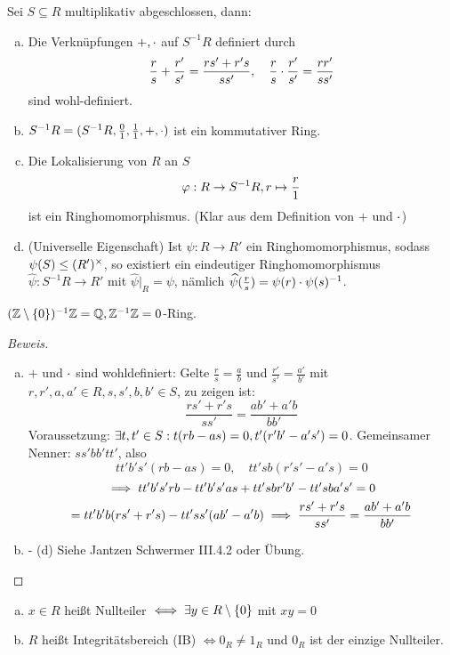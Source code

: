 \documentclass[a4paper]{report}
\begin{document}
\begin{satz}
  Sei $S \subseteq R$ multiplikativ abgeschlossen, dann:
  \begin{enumerate}[(a)]
    \item Die Verknüpfungen $+, \cdot$ auf $S^{-1}R$ definiert durch
          \[\frac rs + \frac {r'}{s'} = \frac{rs'+r's}{ss'}, \quad \frac rs \cdot \frac {r'}{s'} = \frac{rr'}{ss'}\]
          sind wohl-definiert.
    \item $S^{-1}R = (S^{-1}R, \frac 01, \frac 11, +, \cdot)$ ist ein kommutativer Ring.
    \item Die Lokalisierung von $R$ an $S$
          \[\varphi : R \to S^{-1}R, r \mapsto \frac r1\]
          ist ein Ringhomomorphismus. (Klar aus dem Definition von $+$ und $\cdot$)
    \item (Universelle Eigenschaft) Ist $\psi : R \to R'$ ein Ringhomomorphismus, sodass $\psi(S) \le (R')^\times$, so existiert ein eindeutiger Ringhomomorphismus $\hat \psi : S^{-1}R \to R'$ mit $\hat \psi |_{R} = \psi$, nämlich $\widehat \psi (\frac rs) = \psi(r) \cdot \psi(s)^{-1}$.
  \end{enumerate}
\end{satz}
\begin{bsp*}$(\mathbb{Z} \setminus \{0\})^{-1}\mathbb{Z} = \mathbb{Q}, \mathbb{Z}^{-1}\mathbb{Z} = 0$-Ring.
\end{bsp*}
\begin{proof}[Beweis]\item
\begin{enumerate}[(a)]
  \item $+$ und $\cdot$ sind wohldefiniert:
        Gelte $\frac rs = \frac ab$ und $\frac {r'}{s'} = \frac {a'}{b'}$ mit $r, r', a, a' \in R, s, s', b, b' \in S$, zu zeigen ist: \[\frac{rs' + r's}{ss'} = \frac{ab' + a'b}{bb'}\]
        Voraussetzung: $\exists t, t' \in S : t(rb - as) = 0, t'(r'b' - a's') = 0$. Gemeinsamer Nenner: $ss'bb'tt'$, also
        \[tt'b's'(rb - as) = 0, \quad tt'sb(r's'-a's) = 0\]
        \[\implies tt'b's'rb - tt'b's'as + tt'sbr'b' - tt'sba's' = 0\]
        \[ = tt'b'b(rs'+r's) - tt'ss'(ab'-a'b) \implies \frac{rs' + r's}{ss'} = \frac{ab' + a'b}{bb'}\]
  \item - (d) Siehe Jantzen Schwermer III.4.2 oder Übung.
\end{enumerate}
\end{proof}

\begin{defi}[Nullteiler]
\begin{enumerate}[(a)]
  \item $x \in R$ heißt Nullteiler $\iff \exists y \in R \setminus \{0\}$ mit $xy = 0$
  \item $R$ heißt Integritätsbereich (IB) $\iff 0_{R} \ne 1_{R}$ und $0_{R}$ ist der einzige Nullteiler.
\end{enumerate}
\end{defi}
\end{document}
